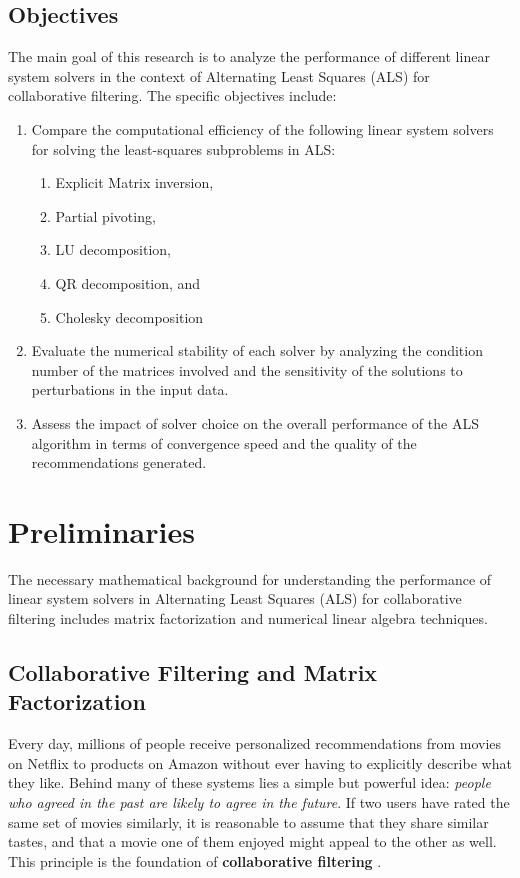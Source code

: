 \documentclass[12pt,a4paper]{report}
\begin{document}
\section{Objectives}
The main goal of this research is to analyze the performance of different linear system solvers in the context of Alternating Least Squares (ALS) for collaborative filtering. The specific objectives include:
\begin{enumerate}
\item Compare the computational efficiency of the following linear system solvers for solving the least-squares subproblems in ALS:
\begin{enumerate}[label*=\arabic*.]
\item Explicit Matrix inversion,
\item Partial pivoting,
\item LU decomposition,
\item QR decomposition, and
\item Cholesky decomposition
\end{enumerate}
\item Evaluate the numerical stability of each solver by analyzing the condition number of the matrices involved and the sensitivity of the solutions to perturbations in the input data.
\item Assess the impact of solver choice on the overall performance of the ALS algorithm in terms of convergence speed and the quality of the recommendations generated.

\end{enumerate}

\vspace{4em}

\chapter*{Preliminaries}

The necessary mathematical background for understanding the performance of linear system solvers in Alternating Least Squares (ALS) for collaborative filtering includes matrix factorization and numerical linear algebra techniques.

\section{Collaborative Filtering and Matrix Factorization}

Every day, millions of people receive personalized recommendations from movies on Netflix to products on Amazon without ever having to explicitly describe what they like. Behind many of these systems lies a simple but powerful idea: \textit{people who agreed in the past are likely to agree in the future}. If two users have rated the same set of movies similarly, it is reasonable to assume that they share similar tastes, and that a movie one of them enjoyed might appeal to the other as well. This principle is the foundation of \textbf{collaborative filtering} \parencite{ricci2015recommender}.
\end{document}
